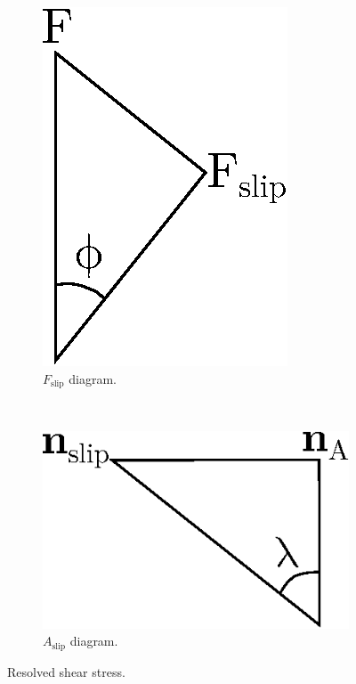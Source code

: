 \documentclass[a4paper]{article}
\begin{document}
\begin{figure}
\begin{subfigure}[b]{0.2\linewidth}
			\includegraphics[width=\linewidth]{fslip.eps}
			\caption{$F_{\textrm{slip}}$ diagram.}
		\end{subfigure}
		~
		\begin{subfigure}[b]{0.35\linewidth}
			\centering
			\includegraphics[width=\linewidth]{aslip.eps}
			\caption{$A_{\textrm{slip}}$ diagram.}
		\end{subfigure}
		\caption{Resolved shear stress.}
		\label{f:rstress}
	\end{figure}
\end{document}
